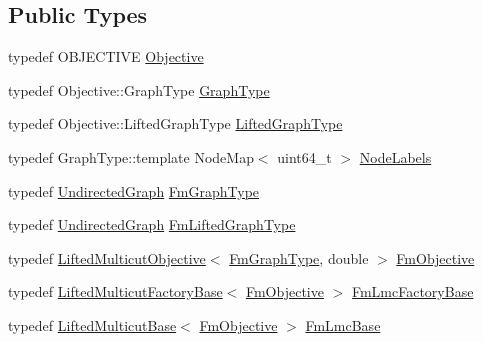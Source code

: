 \subsection*{Public Types}
\begin{DoxyCompactItemize}
\item 
typedef O\+B\+J\+E\+C\+T\+I\+V\+E \hyperlink{classnifty_1_1graph_1_1lifted__multicut_1_1FusionMove_a8a17b97a0a28823e4a4c37f79337b2a0}{Objective}
\item 
typedef Objective\+::\+Graph\+Type \hyperlink{classnifty_1_1graph_1_1lifted__multicut_1_1FusionMove_afe918cca306f3d00480c7908da070281}{Graph\+Type}
\item 
typedef Objective\+::\+Lifted\+Graph\+Type \hyperlink{classnifty_1_1graph_1_1lifted__multicut_1_1FusionMove_a4e1aa5954b9192884548f95a84ad6ef8}{Lifted\+Graph\+Type}
\item 
typedef Graph\+Type\+::template Node\+Map$<$ uint64\+\_\+t $>$ \hyperlink{classnifty_1_1graph_1_1lifted__multicut_1_1FusionMove_a8f1a83b6d5d475f4d430fe12aa15b852}{Node\+Labels}
\item 
typedef \hyperlink{classnifty_1_1graph_1_1UndirectedGraph}{Undirected\+Graph} \hyperlink{classnifty_1_1graph_1_1lifted__multicut_1_1FusionMove_a673b31d12a14cc0303334d17ac46a0db}{Fm\+Graph\+Type}
\item 
typedef \hyperlink{classnifty_1_1graph_1_1UndirectedGraph}{Undirected\+Graph} \hyperlink{classnifty_1_1graph_1_1lifted__multicut_1_1FusionMove_a069f82dc2713d636a830b97dc82da08a}{Fm\+Lifted\+Graph\+Type}
\item 
typedef \hyperlink{classnifty_1_1graph_1_1lifted__multicut_1_1LiftedMulticutObjective}{Lifted\+Multicut\+Objective}$<$ \hyperlink{classnifty_1_1graph_1_1lifted__multicut_1_1FusionMove_a673b31d12a14cc0303334d17ac46a0db}{Fm\+Graph\+Type}, double $>$ \hyperlink{classnifty_1_1graph_1_1lifted__multicut_1_1FusionMove_a41ae4e1f1fa44e3a67e5a62dc3098083}{Fm\+Objective}
\item 
typedef \hyperlink{classnifty_1_1graph_1_1lifted__multicut_1_1LiftedMulticutFactoryBase}{Lifted\+Multicut\+Factory\+Base}$<$ \hyperlink{classnifty_1_1graph_1_1lifted__multicut_1_1FusionMove_a41ae4e1f1fa44e3a67e5a62dc3098083}{Fm\+Objective} $>$ \hyperlink{classnifty_1_1graph_1_1lifted__multicut_1_1FusionMove_ac2b4a0ecbc324dd7b5b4a7805c714aae}{Fm\+Lmc\+Factory\+Base}
\item 
typedef \hyperlink{classnifty_1_1graph_1_1lifted__multicut_1_1LiftedMulticutBase}{Lifted\+Multicut\+Base}$<$ \hyperlink{classnifty_1_1graph_1_1lifted__multicut_1_1FusionMove_a41ae4e1f1fa44e3a67e5a62dc3098083}{Fm\+Objective} $>$ \hyperlink{classnifty_1_1graph_1_1lifted__multicut_1_1FusionMove_aa22a440b84a78fb5651a35b006177c30}{Fm\+Lmc\+Base}

\end{DoxyCompactItemize}
